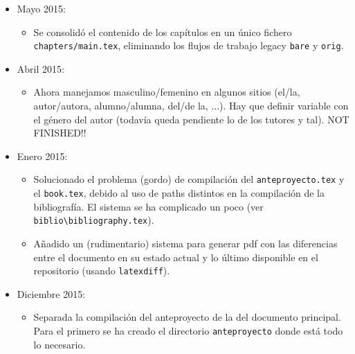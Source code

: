 \begin{itemize}
\begin{itemize}
\begin{itemize}
    \end{itemize}
    
  \item Reestructuración completa de la estructura de directorios
  \item Soporte para el manejo adecuado de los ``sexos'', para lo
    que hay que definirlos en el fichero de configuración. Creo que es
    completo, pero si veis algún error, dadme un toque.
  \item Soporte completo (por fin) de utf-8, salvo en los ficheros
    .bib que no lo he conseguido.    
  \end{itemize}
  
\item Mayo 2015:
  \begin{itemize}
  \item Se consolidó el contenido de los capítulos en un único fichero
    \texttt{chapters/main.tex}, eliminando los flujos de trabajo legacy
    \texttt{bare} y \texttt{orig}.
  \end{itemize}


\item Abril 2015:
  \begin{itemize}
  \item Ahora manejamos masculino/femenino en algunos sitios (el/la,
    autor/autora, alumno/alumna, del/de la, ...). Hay que definir
    variable con el género del autor (todavía queda pendiente lo de los
    tutores y tal). NOT FINISHED!!
  \end{itemize}


\item Enero 2015:
  \begin{itemize}
  \item Solucionado el problema (gordo) de compilación del
    \texttt{anteproyecto.tex} y el \texttt{book.tex}, debido al uso de
    paths distintos en la compilación de la bibliografía. El sistema se ha
    complicado un poco (ver
    \texttt{biblio\textbackslash{}bibliography.tex}).
  \item Añadido un (rudimentario) sistema para generar pdf con las
    diferencias entre el documento en su estado actual y lo último
    disponible en el repositorio (usando \texttt{latexdiff}).
  \end{itemize}
\item Diciembre 2015:
  \begin{itemize}
  \item Separada la compilación del anteproyecto de la del documento
    principal. Para el primero se ha creado el directorio
    \texttt{anteproyecto} donde está todo lo necesario.
  \end{itemize}
\end{itemize}





